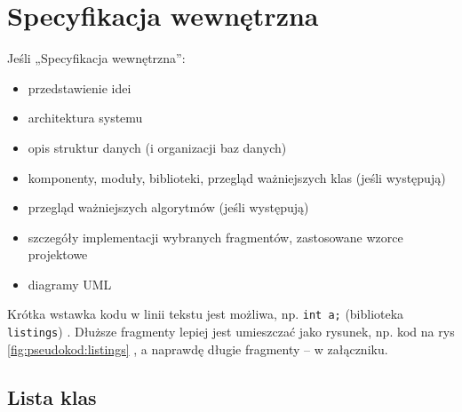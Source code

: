 \documentclass[a4paper,twoside,12pt]{book}
\begin{document}
\chapter{Specyfikacja wewnętrzna}
\label{ch:05}


Jeśli „Specyfikacja wewnętrzna”:
\begin{itemize}
\item przedstawienie idei
\item architektura systemu
\item opis struktur danych (i organizacji baz danych)
\item komponenty, moduły, biblioteki, przegląd ważniejszych klas (jeśli występują)
\item przegląd ważniejszych algorytmów (jeśli występują)
\item szczegóły implementacji wybranych fragmentów, zastosowane wzorce projektowe
\item diagramy UML
\end{itemize}



Krótka wstawka kodu w linii tekstu jest możliwa, np.  \lstinline|int a;| (biblioteka \texttt{listings})%
. 
Dłuższe fragmenty lepiej jest umieszczać jako rysunek, np. kod na rys \ref{fig:pseudokod:listings}%
, a naprawdę długie fragmenty – w załączniku.


      

\section{Lista klas}
\end{document}
